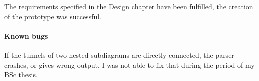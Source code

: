 The requirements specified in the Design chapter have been fulfilled, the creation of the prototype was successful.

\paragraph{Known bugs} If the tunnels of two nested subdiagrams are directly connected, the parser crashes, or gives wrong output. I was not able to fix that during the period of my BSc thesis.

